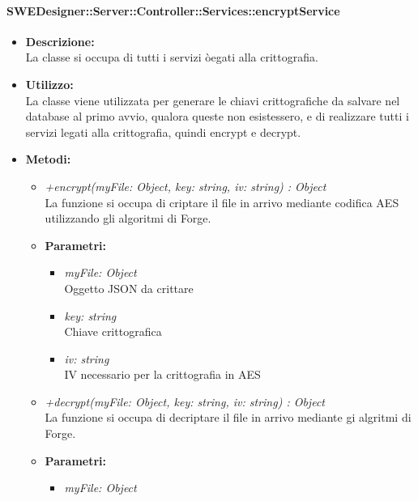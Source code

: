       \paragraph{SWEDesigner::Server::Controller::Services::encryptService}
        \begin{itemize}
          \item \textbf{Descrizione: }\\
          La classe si occupa di tutti i servizi òegati alla crittografia.
          \item \textbf{Utilizzo: }\\
          La classe viene utilizzata per generare le chiavi crittografiche da salvare nel database al primo avvio, qualora queste non esistessero, e di realizzare tutti i servizi legati alla crittografia, quindi encrypt e decrypt.
          \item \textbf{Metodi: }\\
            \begin{itemize}
            \item \emph{+encrypt(myFile: Object, key: string, iv: string) : Object}\\
            La funzione si occupa di criptare il file in arrivo mediante codifica AES utilizzando gli algoritmi di Forge.
            \item \textbf{Parametri: }\\
            \begin{itemize}
              \item \emph{myFile: Object}\\
              Oggetto JSON da crittare
              \item \emph{key: string}\\
              Chiave crittografica
              \item \emph{iv: string}\\
              IV necessario per la crittografia in AES
            \end{itemize}
            \item \emph{+decrypt(myFile: Object, key: string, iv: string) : Object}\\
            La funzione si occupa di decriptare il file in arrivo mediante gi algritmi di Forge.
            \item \textbf{Parametri: }\\
            \begin{itemize}
              \item \emph{myFile: Object}\\

\end{itemize}
\end{itemize}
\end{itemize}
